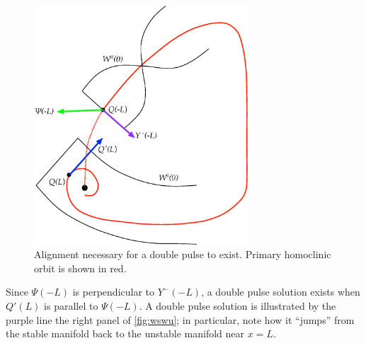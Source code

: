 \documentclass[thesis2.tex]{subfiles}
\begin{document}
\begin{figure}
\begin{center}
\includegraphics[width=8cm]{images/intro/manifoldslineup}
\caption[Alignment of manifolds necessary for a double pulse]{Alignment necessary for a double pulse to exist. Primary homoclinic orbit is shown in red.}
\label{fig:manifoldslineup}
\end{center}
\end{figure}
Since $\Psi(-L)$ is perpendicular to $Y^-(-L)$, a double pulse solution exists when $Q'(L)$ is parallel to $\Psi(-L)$. A double pulse solution is illustrated by the purple line the right panel of \cref{fig:wswu}; in particular, note how it ``jumps'' from the stable manifold back to the unstable manifold near $x = L$.
\end{document}
